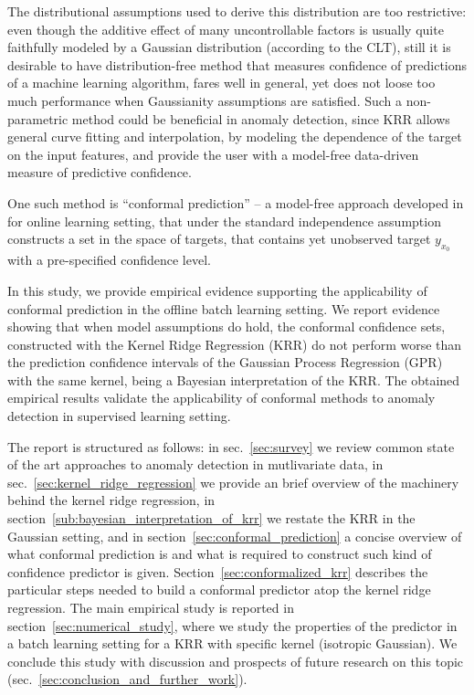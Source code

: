 \documentclass[a4paper,14pt]{extarticle}
\begin{document}
The distributional assumptions used to derive this distribution are too restrictive:
even though the additive effect of many uncontrollable factors is usually quite
faithfully modeled by a Gaussian distribution (according to the CLT), still it is
desirable to have distribution-free method that measures confidence of predictions
of a machine learning algorithm, fares well in general, yet does not loose too much
performance when Gaussianity assumptions are satisfied. Such a non-parametric method
could be beneficial in anomaly detection, since KRR allows general curve fitting
and interpolation, by modeling the dependence of the target on the input features,
and provide the user with a model-free data-driven measure of predictive confidence.

One such method is ``conformal prediction'' -- a model-free approach developed in
\cite{vovk2005} for online learning setting, that under the standard independence
assumption constructs a set in the space of targets, that contains yet unobserved
target $y_{x_0}$ with a pre-specified confidence level.

In this study, we provide empirical evidence supporting the applicability of conformal
prediction in the offline batch learning setting. We report evidence showing that when
model assumptions do hold, the conformal confidence sets, constructed with the Kernel
Ridge Regression (KRR) do not perform worse than the prediction confidence intervals
of the Gaussian Process Regression (GPR) with the same kernel, being a Bayesian
interpretation of the KRR. The obtained empirical results validate the applicability
of conformal methods to anomaly detection in supervised learning setting.

The report is structured as follows: in sec.~\ref{sec:survey} we review common state
of the art approaches to anomaly detection in mutlivariate data, in sec.~\ref{sec:kernel_ridge_regression}
we provide an brief overview of the machinery behind the kernel ridge regression, in
section~\ref{sub:bayesian_interpretation_of_krr} we restate the KRR in the Gaussian
setting, and in section~\ref{sec:conformal_prediction} a concise overview of what
conformal prediction is and what is required to construct such kind of confidence
predictor is given. Section~\ref{sec:conformalized_krr} describes the particular
steps needed to build a conformal predictor atop the kernel ridge regression.
The main empirical study is reported in section~\ref{sec:numerical_study}, where
we study the properties of the predictor in a batch learning setting for a KRR
with specific kernel (isotropic Gaussian). We conclude this study with discussion
and prospects of future research on this topic (sec.~\ref{sec:conclusion_and_further_work}).
\end{document}
